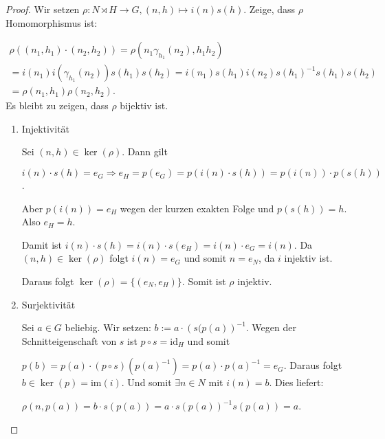 \documentclass[12pt]{scrartcl}%
\theoremstyle{definition}
\theoremstyle{remark}
\newcommand{\inv}[1]{\left(#1\right)^{-1}}
\newcommand{\Inv}[1]{#1^{-1}}
\begin{document}
\begin{proof}
    Wir setzen $\rho: N\rtimes H \to G, (n,h)\mapsto i(n)s(h)$. Zeige, dass $\rho$ Homomorphismus ist:

    \begin{gather*}
        \rho((n_1,h_1)\cdot (n_2,h_2)) = \rho(n_1\gamma_{h_1}(n_2), h_1h_2) \\
        = i(n_1)i(\gamma_{h_1}(n_2))s(h_1)s(h_2) = i(n_1)s(h_1)i(n_2)\Inv{s(h_1)}s(h_1)s(h_2) \\
        = \rho(n_1,h_1)\rho(n_2,h_2).
    \end{gather*}
    Es bleibt zu zeigen, dass $\rho$ bijektiv ist.
    
    
    
    \begin{enumerate}
    \item{Injektivität}
    
    Sei $(n,h)\in \ker(\rho)$. Dann gilt

    $i(n)\cdot s(h) = e_G \Rightarrow e_H = p(e_G) = p(i(n)\cdot s(h)) = p(i(n))\cdot p(s(h))$.

    Aber $p(i(n)) = e_H$ wegen der kurzen exakten Folge und $p(s(h)) = h$. Also $e_H = h$.

    Damit ist $i(n)\cdot s(h) = i(n)\cdot s(e_H) = i(n)\cdot e_G = i(n)$. Da $(n,h)\in\ker(\rho)$ folgt $i(n) = e_G$ und somit $n=e_N$, da $i$ injektiv ist.

    Daraus folgt $\ker(\rho) = \{(e_N,e_H)\}$. Somit ist $\rho$ injektiv.
    \item{Surjektivität}
    
    Sei $a\in G$ beliebig. Wir setzen: $b := a\cdot\inv{s(p(a)}$. Wegen der Schnitteigenschaft von $s$ ist $p\circ s = \text{id}_H$ und somit

    $p(b) = p(a)\cdot (p\circ s)(\Inv{p(a)})=p(a)\cdot\Inv{p(a)}=e_G$. Daraus folgt $b\in\ker(p)= \text{im}(i)$. Und somit $\exists n\in N$ mit $i(n) = b$. Dies liefert:

    $\rho(n,p(a)) = b\cdot s(p(a))=a\cdot s(p(a))^{-1}s(p(a))=a$.
    \end{enumerate}
    
\end{proof}
\end{document}
